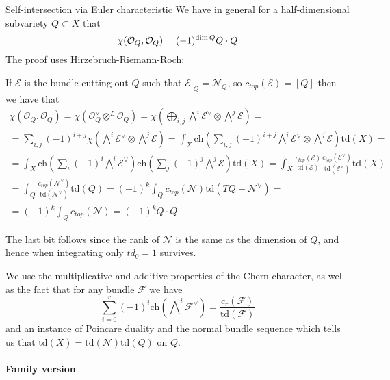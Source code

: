 \begin{remark}{Self-intersection via Euler characteristic}{}
    We have in general for a half-dimensional subvariety $Q\subset X$ that $$\chi(\mathcal{O}_Q, \mathcal{O}_Q)=(-1)^{\dim Q}Q\cdot Q$$ The proof uses Hirzebruch-Riemann-Roch:

    If $\mathcal{E}$ is the bundle cutting out $Q$ such that $\mathcal{E}|_Q=\mathcal{N}_Q$, so $c_{top}(\mathcal{E})=[Q]$ then we have that 
    $$\begin{gathered}
    \chi(\mathcal{O}_Q, \mathcal{O}_Q)=\chi(\mathcal{O}_Q^\vee \otimes^L \mathcal{O}_Q)=\chi(\bigoplus_{i,j} \bigwedge\nolimits^i \mathcal{E}^\vee \otimes \bigwedge\nolimits^j\mathcal{E})=\\=\sum_{i,j}(-1)^{i+j}\chi(\bigwedge\nolimits^i \mathcal{E}^\vee \otimes \bigwedge\nolimits^j \mathcal{E}) =\int_X \mathrm{ch}\left( \sum_{i,j} (-1)^{i+j}\bigwedge\nolimits^i \mathcal{E}^\vee \otimes \bigwedge\nolimits^j\mathcal{E} \right)\mathrm{td}(X)=\\
    =\int_X \mathrm{ch}\left( \sum_i (-1)^i \bigwedge\nolimits^i \mathcal{E}^\vee  \right) \mathrm{ch}\left( \sum_j (-1)^j \bigwedge\nolimits^j \mathcal{E}  \right)\mathrm{td}(X)=\int_X \frac{c_{top}(\mathcal{E})}{\mathrm{td}(\mathcal{E})}\frac{c_{top}(\mathcal{E}^\vee)}{\mathrm{td}(\mathcal{E}^\vee)}\mathrm{td}(X)\\
    =\int_Q  \frac{c_{top}(\mathcal{N}^\vee)}{\mathrm{td}(\mathcal{N}^\vee)}\mathrm{td}(Q)=(-1)^k\int_Q c_{top}(\mathcal{N})\mathrm{td}(TQ-\mathcal{N}^\vee)=\\=(-1)^k \int_{Q} c_{top}(\mathcal{N})=(-1)^k Q\cdot Q  \end{gathered}$$

    The last bit follows since the rank of $\mathcal{N}$ is the same as the dimension of $Q$, and hence when integrating only $td_0=1$ survives.

    We use the multiplicative and additive properties of the Chern character, as well as the fact that for any bundle $\mathcal{F}$ we have $$\sum_{i=0}^r (-1)^i \mathrm{ch}(\bigwedge\nolimits ^i \mathcal{F}^\vee)=\frac{c_r(\mathcal{F})}{\mathrm{td}(\mathcal{F})}$$ and an instance of Poincare duality and the normal bundle sequence which tells us that $\mathrm{td}(X)=\mathrm{td}(\mathcal{N}
    )\mathrm{td}(Q)$ on $Q$.
\end{remark}

\paragraph*{Family version}

